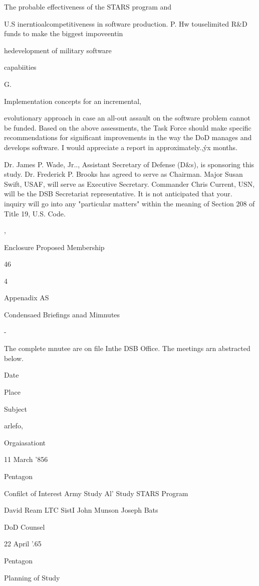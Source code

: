 \documentclass[12pt]{article}
\begin{document}
The probable effectiveness of the STARS program and

U.S
inerntioalcompetitiveness in software production.
P.
Hw touselimited R\&D funds to make the biggest
impoveentin

hedevelopment of military software

capabiities

G.

Implementation concepts for an incremental,

evolutionary approach in case an all-out assault on the software
problem cannot be funded.
Based on the above assessments, the Task Force should make
specific recommendations for significant improvements in the way
the DoD manages and develops software.
I would appreciate a
report in approximately.,ýx months.

Dr. James P. Wade, Jr.., Assistant Secretary of Defense
(D\&s), is sponsoring this study. Dr. Frederick P. Brooks has
agreed to serve as Chairman.
Major Susan Swift, USAF, will
serve as Executive Secretary.
Commander Chris Current, USN,
will be the DSB Secretariat representative.
It is not
anticipated that your. inquiry will go into any "particular
matters" within the meaning of Section 208 of Title 19,
U.S. Code.

,

Enclosure
Proposed Membership

46

4


Appenadix AS
~

Condensaed Briefings anad Mimnutes

-

The complete mnutee are on file Inthe DSB Office. The meetings arn abstracted below.

Date

Place

Subject

arlefo,

Orgaiasationt

11 March '856

Pentagon

Confilct of Interest
Army Study
Al' Study
STARS Program

David Ream
LTC SistI
John Munson
Joseph Bats

DoD Counsel

22 April '.65

Pentagon

Planning of Study
\end{document}
